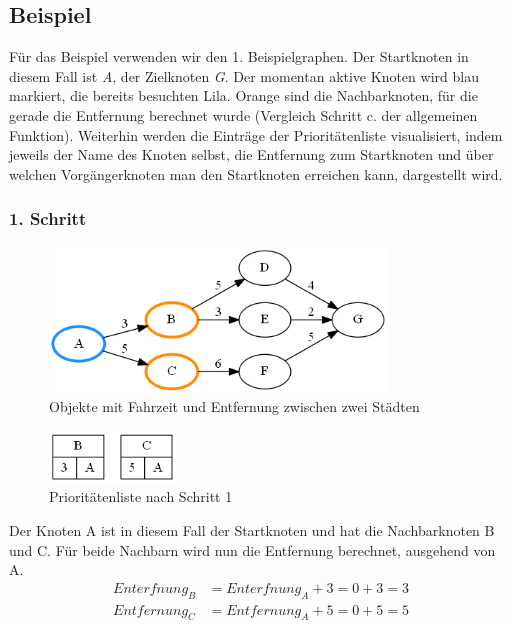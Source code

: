 \documentclass[11pt]{scrreprt}
\begin{document}
		\newpage
		\subsection{Beispiel}
		Für das Beispiel verwenden wir den 1. Beispielgraphen. Der Startknoten in diesem Fall ist \textit{A}, der Zielknoten \textit{G}. Der momentan aktive Knoten wird blau markiert, die bereits besuchten Lila. Orange sind die Nachbarknoten, für die gerade die Entfernung berechnet wurde (Vergleich Schritt c. der allgemeinen Funktion).
		Weiterhin werden die Einträge der Prioritätenliste visualisiert, indem jeweils der Name des Knoten selbst, die Entfernung zum Startknoten und über welchen Vorgängerknoten man den Startknoten erreichen kann, dargestellt wird.
			\subsubsection{1. Schritt}
			\begin{figure}[ht]
				\centering
				\includegraphics[width=0.8\textwidth]{Graphs/Example1}
				\caption{Objekte mit Fahrzeit und Entfernung zwischen zwei Städten}
			\end{figure}
			\begin{figure}[ht]
				\centering
				\includegraphics[width=0.3\textwidth]{Graphs/Example1_PQ}
				\caption{Prioritätenliste nach Schritt 1}
			\end{figure}
			Der Knoten A ist in diesem Fall der Startknoten und hat die Nachbarknoten B und C.
			Für beide Nachbarn wird nun die Entfernung berechnet, ausgehend von A.
			\begin{align*}
					Enterfnung_B &= Enterfnung_A + 3 = 0 + 3 = 3\\
					Entfernung_C &= Entfernung_A + 5 = 0 + 5 = 5
			\end{align*}
			
\end{document}
